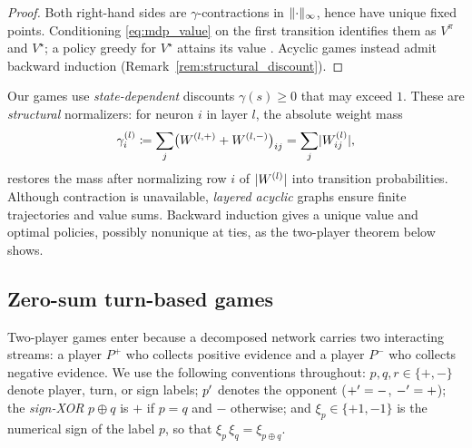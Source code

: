 \begin{proof}
Both right-hand sides are $\gamma$-contractions in $\lVert\cdot\rVert_\infty$, hence have unique fixed points. Conditioning \eqref{eq:mdp_value} on the first transition identifies them as $V^{\pi}$ and $V^{\star}$; a policy greedy for $V^{\star}$ attains its value \parencite{Puterman1994mdp,SuttonBarto2018rl}. Acyclic games instead admit backward induction (Remark~\ref{rem:structural_discount}).
\end{proof}

\begin{remark}\label{rem:structural_discount}
Our games use \emph{state-dependent} discounts $\gamma(s)\ge0$ that may exceed $1$. These are \emph{structural} normalizers: for neuron $i$ in layer $l$, the absolute weight mass
\begin{equation}
	\gamma^{(l)}_i \coloneqq \sum_{j} \bigl( W^{(l,+)} + W^{(l,-)} \bigr)_{ij} = \sum_j \lvert W^{(l)}_{ij}\rvert,
	\label{eq:structural_discount}
\end{equation}
restores the mass after normalizing row $i$ of $\lvert W^{(l)}\rvert$ into transition probabilities. Although contraction is unavailable, \emph{layered acyclic} graphs ensure finite trajectories and value sums. Backward induction gives a unique value and optimal policies, possibly nonunique at ties, as the two-player theorem below shows.
\end{remark}

\subsection*{Zero-sum turn-based games}

Two-player games enter because a decomposed network carries two interacting streams: a player $P^{+}$ who collects positive evidence and a player $P^{-}$ who collects negative evidence. We use the following conventions throughout: $p, q, r \in \{+, -\}$ denote player, turn, or sign labels; $p'$ denotes the opponent ($+' = -$, $-' = +$); the \emph{sign-XOR} $p \oplus q$ is $+$ if $p = q$ and $-$ otherwise; and $\xi_{p} \in \{+1, -1\}$ is the numerical sign of the label $p$, so that $\xi_{p}\, \xi_{q} = \xi_{p \oplus q}$.

